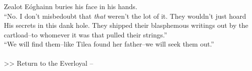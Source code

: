 Zealot Eóghainn buries his face in his hands.\\

“No. I don’t misbedoubt that \emph{that} weren’t the lot of it. They wouldn’t just hoard His secrets in this dank hole. They shipped their blasphemous writings out by the cartload--to whomever it was that pulled their strings.”\\

“We will find them--like Tilea found her father--we will seek them out.”\\
\\

>>  Return to the Everloyal -- 